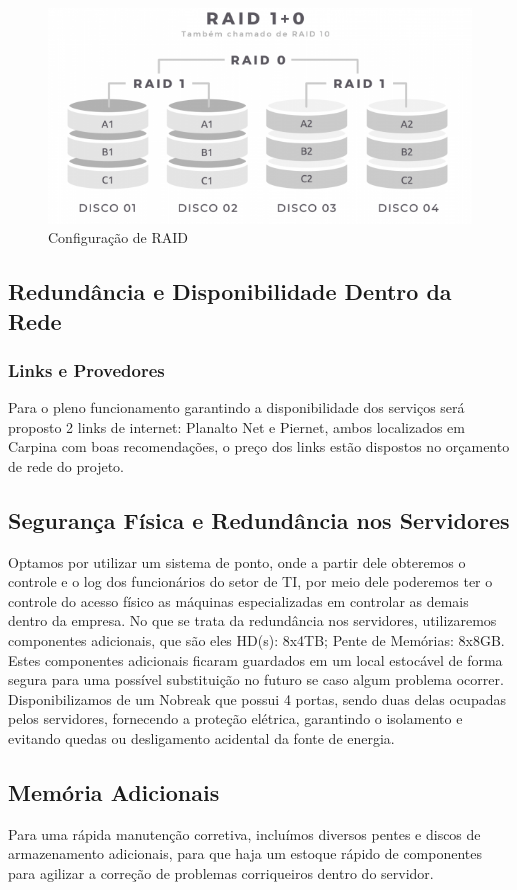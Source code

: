 \documentclass[12pt]{article}
\begin{document}
\begin{figure}[ht]
\centering
\includegraphics[height=0.3\textwidth]{RAID10.png}
\caption{Configuração de RAID}
\label{fig:adds-pastas}
\end{figure}

\subsection{Redundância e Disponibilidade Dentro da Rede}

\subsubsection{Links e Provedores}
Para o pleno funcionamento garantindo a disponibilidade dos serviços será proposto 2 links de internet: Planalto Net e Piernet, ambos localizados em Carpina com boas recomendações, o preço dos links estão dispostos no orçamento de rede do projeto.

\subsection{Segurança Física e Redundância nos Servidores}
Optamos por utilizar um sistema de ponto, onde a partir dele obteremos o controle e o log dos funcionários do setor de TI, por meio dele poderemos ter o controle do acesso físico as máquinas especializadas em controlar as demais dentro da empresa. No que se trata da redundância nos servidores, utilizaremos componentes adicionais, que são eles HD(s): 8x4TB; Pente de Memórias: 8x8GB. Estes componentes adicionais ficaram guardados em um local estocável de forma segura para uma possível substituição no futuro se caso algum problema ocorrer. Disponibilizamos de um Nobreak que possui 4 portas, sendo duas delas ocupadas pelos servidores, fornecendo a proteção elétrica, garantindo o isolamento e evitando quedas ou desligamento acidental da fonte de energia.

\subsection{Memória Adicionais}
Para uma rápida manutenção corretiva, incluímos diversos pentes e discos de armazenamento adicionais, para que haja um estoque rápido de componentes para agilizar a correção de problemas corriqueiros dentro do servidor.
\end{document}
